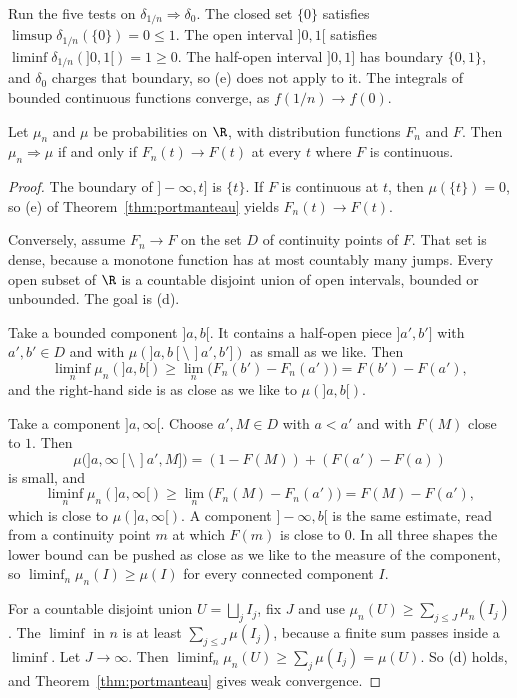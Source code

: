 Run the five tests on $\delta_{1/n}\Rightarrow\delta_0$. The closed set $\{0\}$ satisfies $\limsup\delta_{1/n}(\{0\})=0\le 1$. The open interval
$]0,1[$ satisfies $\liminf\delta_{1/n}(]0,1[)=1\ge 0$. The half-open interval $]0,1]$ has boundary $\{0,1\}$, and $\delta_0$ charges that
boundary, so (e) does not apply to it. The integrals of bounded continuous functions converge, as $f(1/n)\to f(0)$.

\begin{corollary}\label{cor:cdfweak}
Let $\mu_n$ and $\mu$ be probabilities on $\R$, with distribution functions $F_n$ and $F$. Then $\mu_n\Rightarrow\mu$ if and only if
$F_n(t)\to F(t)$ at every $t$ where $F$ is continuous.
\end{corollary}
\begin{proof}
The boundary of $]-\infty,t]$ is $\{t\}$. If $F$ is continuous at $t$, then $\mu(\{t\})=0$, so (e) of Theorem~\ref{thm:portmanteau} yields
$F_n(t)\to F(t)$.

Conversely, assume $F_n\to F$ on the set $D$ of continuity points of $F$. That set is dense, because a monotone function has at most
countably many jumps. Every open subset of $\R$ is a countable disjoint union of open intervals, bounded or unbounded. The goal is (d).

Take a bounded component $]a,b[$. It contains a half-open piece $]a',b']$ with $a',b'\in D$ and with $\mu(]a,b[\setminus\,]a',b'])$ as small
as we like. Then
\[\liminf_n\mu_n(]a,b[)\ge\lim_n\bigl(F_n(b')-F_n(a')\bigr)=F(b')-F(a'),\]
and the right-hand side is as close as we like to $\mu(]a,b[)$.

Take a component $]a,\infty[$. Choose $a',M\in D$ with $a<a'$ and with $F(M)$ close to $1$. Then
\[\mu\bigl(]a,\infty[\setminus\,]a',M]\bigr)=(1-F(M))+(F(a')-F(a))\]
is small, and
\[\liminf_n\mu_n(]a,\infty[)\ge\lim_n\bigl(F_n(M)-F_n(a')\bigr)=F(M)-F(a'),\]
which is close to $\mu(]a,\infty[)$. A component $]-\infty,b[$ is the same estimate, read from a continuity point $m$ at which $F(m)$ is close
to $0$. In all three shapes the lower bound can be pushed as close as we like to the measure of the component, so
$\liminf_n\mu_n(I)\ge\mu(I)$ for every connected component $I$.

For a countable disjoint union $U=\bigsqcup_j I_j$, fix $J$ and use $\mu_n(U)\ge\sum_{j\le J}\mu_n(I_j)$. The $\liminf$ in $n$ is at least
$\sum_{j\le J}\mu(I_j)$, because a finite sum passes inside a $\liminf$. Let $J\to\infty$. Then
$\liminf_n\mu_n(U)\ge\sum_j\mu(I_j)=\mu(U)$. So (d) holds, and Theorem~\ref{thm:portmanteau} gives weak convergence.
\end{proof}

